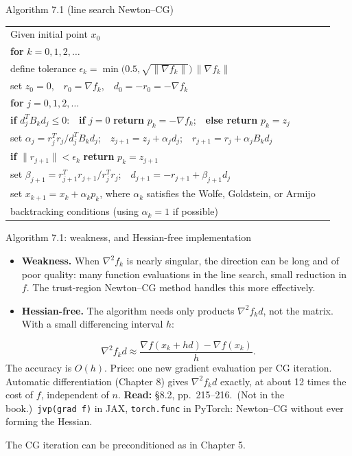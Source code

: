 \documentclass[aspectratio=169,12pt]{beamer}
\makeatletter
\newcommand{\gradf}{\nabla f}
\newcommand{\hessf}{\nabla^{2} f}
\newcommand{\readbook}[1]{{\color{red}\textbf{Read:} #1}}
\newcommand{\notinbook}{{\small(Not in the book.)}}
\newcommand{\algostretch}{1.12}
\newenvironment{algo}{\par\renewcommand{\arraystretch}{\algostretch}%
  \begin{tabular}{@{}l@{\hspace{2.2em}}l@{}}}{\end{tabular}\par}
\makeatother
\begin{document}
\begin{frame}{Algorithm 7.1 (line search Newton--CG)}
  \begin{block}{}\small
    \begin{algo}
      Given initial point $x_{0}$ & \\
      \textbf{for} $k=0,1,2,\dots$ & \\
      \quad define tolerance $\epsilon_{k}=\min\big(0.5,\sqrt{\|\gradf_{k}\|}\big)\,\|\gradf_{k}\|$ & \\
      \quad set $z_{0}=0$,\ \ $r_{0}=\gradf_{k}$,\ \ $d_{0}=-r_{0}=-\gradf_{k}$ & \\
      \quad \textbf{for} $j=0,1,2,\dots$ & \\
      \qquad \textbf{if} $d_{j}^{T}B_{k}d_{j}\le 0$:\ \ \textbf{if} $j=0$ \textbf{return} $p_{k}=-\gradf_{k}$;\ \
             \textbf{else return} $p_{k}=z_{j}$ & \\
      \qquad set $\alpha_{j}=r_{j}^{T}r_{j}/d_{j}^{T}B_{k}d_{j}$;\ \ $z_{j+1}=z_{j}+\alpha_{j}d_{j}$;\ \
             $r_{j+1}=r_{j}+\alpha_{j}B_{k}d_{j}$ & \\
      \qquad \textbf{if} $\|r_{j+1}\|<\epsilon_{k}$ \textbf{return} $p_{k}=z_{j+1}$ & \\
      \qquad set $\beta_{j+1}=r_{j+1}^{T}r_{j+1}/r_{j}^{T}r_{j}$;\ \ $d_{j+1}=-r_{j+1}+\beta_{j+1}d_{j}$ & \\
      \quad set $x_{k+1}=x_{k}+\alpha_{k}p_{k}$, where $\alpha_{k}$ satisfies the Wolfe, Goldstein, or
            Armijo & \\
      \qquad backtracking conditions (using $\alpha_{k}=1$ if possible) & \\
    \end{algo}
  \end{block}
\end{frame}

\begin{frame}{Algorithm 7.1: weakness, and Hessian-free implementation}
  \begin{itemize}\setlength\itemsep{0.5em}
    \item \textbf{Weakness.} When $\hessf_{k}$ is nearly singular, the direction can be long and
      of poor quality: many function evaluations in the line search, small reduction in $f$.
      The trust-region Newton--CG method handles this more effectively.
    \item \textbf{Hessian-free.} The algorithm needs only products $\hessf_{k}d$, not the matrix.
      With a small differencing interval $h$:
  \end{itemize}
  \[ \hessf_{k}d\approx\frac{\gradf(x_{k}+hd)-\gradf(x_{k})}{h} . \tag{7.10} \]
  The accuracy is $O(h)$. Price: \alert{one new gradient evaluation per CG iteration}.\\
  Automatic differentiation (Chapter 8) gives $\hessf_{k}d$ exactly, at about 12 times the cost
  of $f$, independent of $n$. \readbook{\S8.2, pp.~215--216.}\
  \notinbook\ \texttt{jvp(grad f)} in JAX, \texttt{torch.func} in PyTorch:
  Newton--CG without ever forming the Hessian.

  \vspace{0.2em}
  The CG iteration can be preconditioned as in Chapter 5.
\end{frame}
\end{document}
